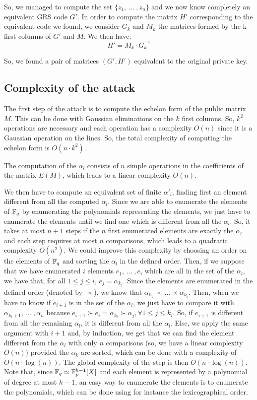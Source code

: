 \documentclass[a4paper]{article}
\begin{document}
So, we managed to compute the set $\{ z_1, \ ... \ ,z_n \}$ and we now know completely an equivalent GRS code $G'$. In order to compute the matrix $H'$ corresponding to the equivalent code we found, we consider
$G_{k}$ and $M_{k}$ the matrices formed by the k first columns of $G'$ and $M$. We then have:
$$H' = M_{k}\cdot G_{k}^{-1}$$

So, we found a pair of matrices $(G',H')$ equivalent to the original private key.

\subsection{Complexity of the attack}
The first step of the attack is to compute the echelon form of the public matrix $M$. This can be done with Gaussian eliminations on the $k$ first columns. So, $k^{2}$ operations are necessary and each
operation has a complexity $O(n)$ since it is a Gaussian operation on the lines. So, the total complexity of computing the echelon form is $O(n\cdot k^{2})$.

The computation  of the $\alpha_l$ consists of $n$ simple operations in the coefficients of the matrix $E(M)$, which leads to a linear complexity $O(n)$.

We then have to compute an equivalent set of finite $\alpha'_l$, finding first an element different from all the computed $\alpha_l$. Since we are able to enumerate the elements of $\mathbb{F}_q$ by enumerating
the polynomials representing the elements, we just have to enumerate the elements until we find  one which is different from all the $\alpha_l$. So, it takes at most $n+1$ steps if the $n$ first enumerated
elements are exactly the $\alpha_l$ and each step requires at most $n$ comparisons, which leads to a quadratic complexity $O(n^{2})$. We could improve this complexity by choosing an order on the elements
of $\mathbb{F}_q$ and sorting the $\alpha_l$ in the defined order. Then, if we suppose that we have enumerated $i$ elements $e_1, \ ... \ , e_i$ which are all in the set of the $\alpha_l$, we have that, for all
$1\leq j\leq i$, $e_j = \alpha_{k_j}$. Since the elements are enumerated in the defined order (denoted by $\prec$), we know that $\alpha_{k_1} \prec \ ... \prec \alpha_{k_i}$. Then, when we have to know if
$e_{i+1}$ is in the set of the $\alpha_l$, we just have to compare it with $\alpha_{k_i+1}, \ ... \ , \alpha_n$ because $e_{i+1} \succ e_i = \alpha_{k_i} \succ \alpha_j , \forall 1\leq j\leq k_i$. So, if
$e_{i+1}$ is different from all the remaining $\alpha_l$, it is different from all the $\alpha_l$. Else, we apply the same argument with $i+1$ and, by induction, we get that we can find
the element different from the $\alpha_l$ with only $n$ comparisons (so, we have a linear complexity $O(n)$) provided the $\alpha_k$ are sorted, which can be done with a complexity of $O(n \cdot \log(n))$.
The global complexity of the step is then $O(n \cdot \log(n))$.
Note that, since $\mathbb{F}_q \simeq \mathbb{F}_p^{h-1}[X]$ and each element is represented by a polynomial of degree at most $h-1$, an easy way to enumerate the elements is to enumerate the polynomials, which can
be done using for instance the lexicographical order.
\end{document}
